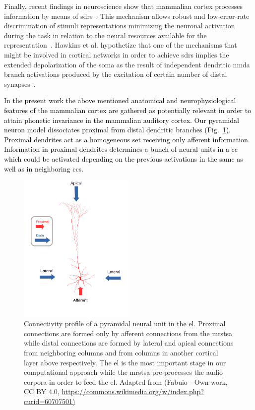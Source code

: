\documentclass[10pt,letterpaper]{article}
\newcommand{\reviewerfive}[1]{\textcolor{black}{#1}}
\begin{document}
Finally, recent findings in neuroscience show that mammalian cortex processes information by means of \glspl{sdr}~\cite{barth_2012}. This mechanism allows robust and low-error-rate discrimination of stimuli representations minimizing the neuronal activation during the task in relation to the neural resources available for the representation~\cite{ahmad_2016}. Hawkins et al. \cite{hawkins_2016} hypothetize that one of the mechanisms that might be involved in cortical networks in order to achieve \glspl{sdr} implies the extended depolarization of the soma as the result of independent dendritic \gls{nmda} branch activations produced by the excitation of certain number of distal synapses~\cite{antic_2010, major_2013}.

\reviewerfive{In the present work the above mentioned anatomical and neurophysiological features of the mammalian cortex are gathered as potentially relevant in order to attain phonetic invariance in the mammalian auditory cortex. Our pyramidal neuron model dissociates proximal from distal dendritic branches (Fig.~\ref{fig:PyramidalCell}). Proximal dendrites act as a homogeneous set receiving only afferent information. Information in proximal dendrites determines a bunch of neural units in a \gls{cc} which could be activated depending on the previous activations in the same as well as in neighboring \glspl{cc}}.

\begin{figure}[h!]
    \centering
    \includegraphics[width=0.5\textwidth]{PyramidalCell.png}
    \caption{Connectivity profile of a pyramidal neural unit in the \gls{el}.
    Proximal connections are formed only by afferent connections from the \gls{mrstsa}
    while distal connections are formed by lateral and apical connections from neighboring columns and
    from columns in another cortical layer above respectively.
    The \gls{el} is the most important stage in our computational approach while the \gls{mrstsa} pre-processes the audio corpora in order to feed the \gls{el}.
    Adapted from 
    (Fabuio - Own work, CC BY 4.0, \url{https://commons.wikimedia.org/w/index.php?curid=60707501)}}
    \label{fig:PyramidalCell}
\end{figure}
\end{document}
